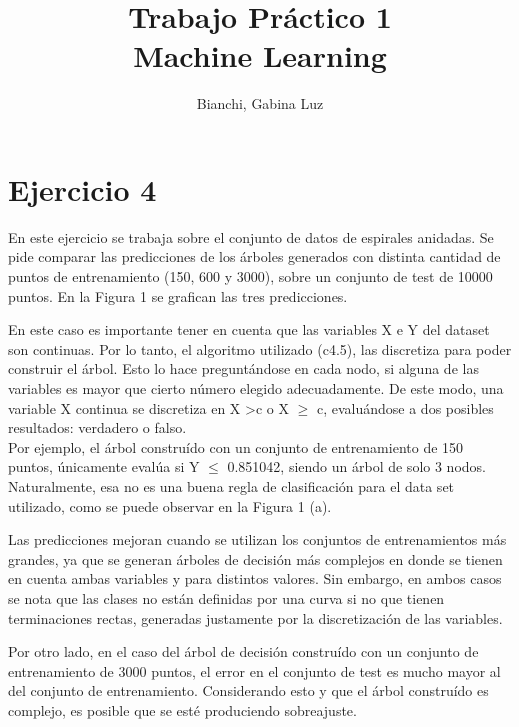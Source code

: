 \documentclass[12pt, a4paper]{article}
\begin{document}
 
\title{Trabajo Práctico 1\\ Machine Learning} 
\author{Bianchi, Gabina Luz} 
\maketitle
\section*{Ejercicio 4}

En este ejercicio se trabaja sobre el conjunto de datos de espirales anidadas. Se pide comparar las predicciones de los árboles generados con distinta cantidad de puntos de entrenamiento (150, 600 y 3000), sobre un conjunto de test de 10000 puntos. En la Figura 1 se grafican las tres predicciones.

\smallskip

En este caso es importante tener en cuenta que las variables X e Y del dataset son continuas. Por lo tanto, el algoritmo utilizado (c4.5), las discretiza para poder construir el árbol. Esto lo hace preguntándose en cada nodo, si alguna de las variables es mayor que cierto número elegido adecuadamente. De este modo, una variable X continua se discretiza en X \textgreater c o X $\geq$ c, evaluándose a dos posibles resultados: verdadero o falso. \\
Por ejemplo, el árbol construído con un conjunto de entrenamiento de 150 puntos, únicamente evalúa si Y $\leq$ 0.851042, siendo un árbol de solo 3 nodos. Naturalmente, esa no es una buena regla de clasificación para el data set utilizado, como se puede observar en la Figura 1 (a).

\smallskip

Las predicciones mejoran cuando se utilizan los conjuntos de entrenamientos más grandes, ya que se generan árboles de decisión más complejos en donde se tienen en cuenta ambas variables y para distintos valores. Sin embargo, en ambos casos se nota que las clases no están definidas por una curva si no que tienen terminaciones rectas, generadas justamente por la discretización de las variables.

\smallskip
Por otro lado, en el caso del árbol de decisión construído con un conjunto de entrenamiento de 3000 puntos, el error en el conjunto de test es mucho mayor al del conjunto de entrenamiento. Considerando esto y que el árbol construído es complejo, es posible que se esté produciendo sobreajuste. 
\end{document}
